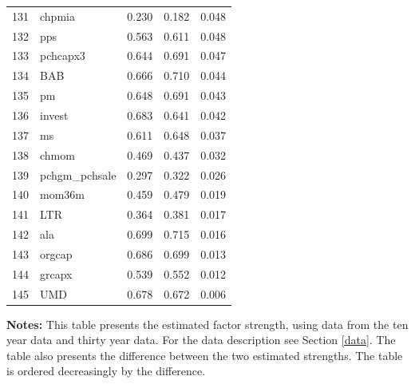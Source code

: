 \begin{footnotesize}
\begin{longtable}{rl|c|c|c}
		131 & chpmia & 0.230 & 0.182 & 0.048 \\ 
		132 & pps & 0.563 & 0.611 & 0.048 \\ 
		133 & pchcapx3 & 0.644 & 0.691 & 0.047 \\ 
		134 & BAB & 0.666 & 0.710 & 0.044 \\ 
		135 & pm & 0.648 & 0.691 & 0.043 \\ 
		136 & invest & 0.683 & 0.641 & 0.042 \\ 
		137 & ms & 0.611 & 0.648 & 0.037 \\ 
		138 & chmom & 0.469 & 0.437 & 0.032 \\ 
		139 & pchgm\_pchsale & 0.297 & 0.322 & 0.026 \\ 
		140 & mom36m & 0.459 & 0.479 & 0.019 \\ 
		141 & LTR & 0.364 & 0.381 & 0.017 \\ 
		142 & ala & 0.699 & 0.715 & 0.016 \\ 
		143 & orgcap & 0.686 & 0.699 & 0.013 \\ 
		144 & grcapx & 0.539 & 0.552 & 0.012 \\ 
		145 & UMD & 0.678 & 0.672 & 0.006 \\ 
		\hline
	\end{longtable}

			\begin{minipage}{0.7\textwidth}
				
{\footnotesize {\bf Notes:} This table presents the estimated factor strength, using data from the ten year data and thirty year data. For the data description see Section \ref{data}. 
	The table also presents the difference between the two estimated strengths. 
	The table is ordered decreasingly by the difference. }
\end{minipage}

\end{footnotesize}



\newpage

